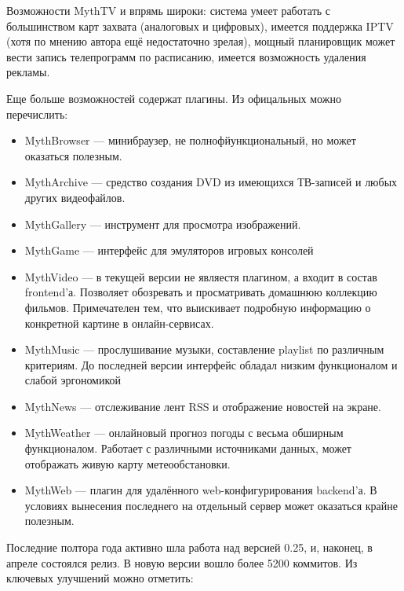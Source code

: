 \documentclass[10pt, a5paper]{article}
\begin{document}
Возможности MythTV и впрямь широки: система умеет работать с большинством карт захвата (аналоговых и цифровых), имеется поддержка IPTV (хотя по мнению автора ещё недостаточно зрелая), мощный планировщик может вести запись телепрограмм по расписанию, имеется возможность удаления рекламы.

Еще больше возможностей содержат плагины. Из офицальных можно перечислить:

\begin{itemize}
  \item MythBrowser --- минибраузер, не полнофйункциональный, но может оказаться полезным.
  \item MythArchive --- средство создания DVD из имеющихся ТВ-записей и любых других видеофайлов.
  \item MythGallery --- инструмент для просмотра изображений.
  \item MythGame --- интерфейс для эмуляторов игровых консолей
  \item MythVideo --- в текущей версии не являестя плагином, а входит в состав frontend'а. Позволяет обозревать и просматривать домашнюю коллекцию фильмов. Примечателен тем, что выискивает подробную информацию о конкретной картине в онлайн-сервисах.
  \item MythMusic --- прослушивание музыки, составление playlist по различным критериям. До последней версии интерфейс обладал низким функционалом и слабой эргономикой
  \item MythNews --- отслеживание лент RSS и отображение новостей на экране.
  \item MythWeather --- онлайновый прогноз погоды с весьма обширным функционалом. Работает с различными источниками данных, может отображать живую карту метеообстановки.
  \item MythWeb --- плагин для удалённого web-конфигурирования backend'а. В условиях вынесения последнего на отдельный сервер может оказаться крайне полезным.
\end{itemize}

Последние полтора года активно шла работа над версией 0.25, и, наконец, в апреле состоялся релиз.  В новую версии вошло более 5200 коммитов. Из ключевых улучшений можно отметить:
\end{document}
